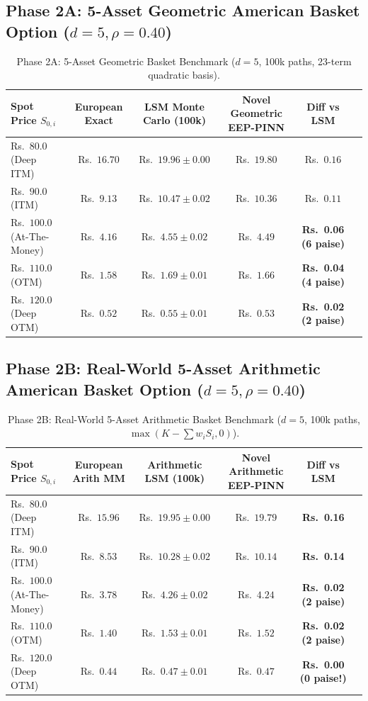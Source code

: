 \documentclass[11pt,a4paper,oneside]{book}
\begin{document}
\subsection{Phase 2A: 5-Asset Geometric American Basket Option ($d=5, \rho=0.40$)}
\begin{table}[htbp]
\centering
\small
\caption{Phase 2A: 5-Asset Geometric Basket Benchmark ($d=5$, 100k paths, 23-term quadratic basis).}
\begin{tabularx}{\textwidth}{@{}l c c c c c@{}}
\toprule
\textbf{Spot Price $S_{0,i}$} & \textbf{European Exact} & \textbf{LSM Monte Carlo (100k)} & \textbf{Novel Geometric EEP-PINN} & \textbf{Diff vs LSM} \\ \midrule
Rs.~$80.0$ (Deep ITM) & Rs.~$16.70$ & Rs.~$19.96 \pm 0.00$ & Rs.~$19.80$ & Rs.~$0.16$ \\
Rs.~$90.0$ (ITM) & Rs.~$9.13$ & Rs.~$10.47 \pm 0.02$ & Rs.~$10.36$ & Rs.~$0.11$ \\
Rs.~$100.0$ (At-The-Money) & Rs.~$4.16$ & Rs.~$4.55 \pm 0.02$ & Rs.~$4.49$ & \textbf{Rs.~0.06 (6 paise)} \\
Rs.~$110.0$ (OTM) & Rs.~$1.58$ & Rs.~$1.69 \pm 0.01$ & Rs.~$1.66$ & \textbf{Rs.~0.04 (4 paise)} \\
Rs.~$120.0$ (Deep OTM) & Rs.~$0.52$ & Rs.~$0.55 \pm 0.01$ & Rs.~$0.53$ & \textbf{Rs.~0.02 (2 paise)} \\ \bottomrule
\end{tabularx}
\end{table}

\subsection{Phase 2B: Real-World 5-Asset Arithmetic American Basket Option ($d=5, \rho=0.40$)}
\begin{table}[htbp]
\centering
\small
\caption{Phase 2B: Real-World 5-Asset Arithmetic Basket Benchmark ($d=5$, 100k paths, $\max(K - \sum w_i S_i, 0)$).}
\begin{tabularx}{\textwidth}{@{}l c c c c c@{}}
\toprule
\textbf{Spot Price $S_{0,i}$} & \textbf{European Arith MM} & \textbf{Arithmetic LSM (100k)} & \textbf{Novel Arithmetic EEP-PINN} & \textbf{Diff vs LSM} \\ \midrule
Rs.~$80.0$ (Deep ITM) & Rs.~$15.96$ & Rs.~$19.95 \pm 0.00$ & Rs.~$19.79$ & \textbf{Rs.~0.16} \\
Rs.~$90.0$ (ITM) & Rs.~$8.53$ & Rs.~$10.28 \pm 0.02$ & Rs.~$10.14$ & \textbf{Rs.~0.14} \\
Rs.~$100.0$ (At-The-Money) & Rs.~$3.78$ & Rs.~$4.26 \pm 0.02$ & Rs.~$4.24$ & \textbf{Rs.~0.02 (2 paise)} \\
Rs.~$110.0$ (OTM) & Rs.~$1.40$ & Rs.~$1.53 \pm 0.01$ & Rs.~$1.52$ & \textbf{Rs.~0.02 (2 paise)} \\
Rs.~$120.0$ (Deep OTM) & Rs.~$0.44$ & Rs.~$0.47 \pm 0.01$ & Rs.~$0.47$ & \textbf{Rs.~0.00 (0 paise!)} \\ \bottomrule
\end{tabularx}
\end{table}
\end{document}
